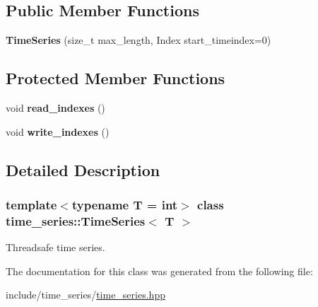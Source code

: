 \subsection*{Public Member Functions}
\begin{DoxyCompactItemize}
\item 
\mbox{\label{classtime__series_1_1TimeSeries_abd15b59569dc3dca7d1b848a0867a117}} 
{\bfseries Time\+Series} (size\+\_\+t max\+\_\+length, Index start\+\_\+timeindex=0)
\end{DoxyCompactItemize}
\subsection*{Protected Member Functions}
\begin{DoxyCompactItemize}
\item 
\mbox{\label{classtime__series_1_1TimeSeries_acbd2aa3299e5c62811df429896791767}} 
void {\bfseries read\+\_\+indexes} ()
\item 
\mbox{\label{classtime__series_1_1TimeSeries_a0fdedf27b55bbf78eed4d35f82cf3ace}} 
void {\bfseries write\+\_\+indexes} ()
\end{DoxyCompactItemize}


\subsection{Detailed Description}
\subsubsection*{template$<$typename T = int$>$\newline
class time\+\_\+series\+::\+Time\+Series$<$ T $>$}

Threadsafe time series. 

The documentation for this class was generated from the following file\+:\begin{DoxyCompactItemize}
\item 
include/time\+\_\+series/\hyperlink{time__series_8hpp}{time\+\_\+series.\+hpp}\end{DoxyCompactItemize}
